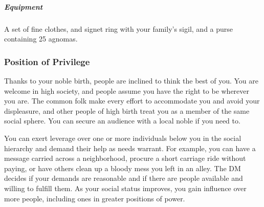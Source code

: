     \subparagraph{Equipment} A set of fine clothes, and signet ring with your family's sigil, and a purse containing 25 agnomas.

    \subsubsection{Position of Privilege}
        Thanks to your noble birth, people are inclined to think the best of you.
        You are welcome in high society, and people assume you have the right to be wherever you are.
        The common folk make every effort to accommodate you and avoid your displeasure, and other people of high birth treat you as a member of the same social sphere.
        You can secure an audience with a local noble if you need to.

        \thispagestyle{empty}

        \newpage

        You can exert leverage over one or more individuals below you in the social hierarchy and demand their help as needs warrant.
        For example, you can have a message carried across a neighborhood, procure a short carriage ride without paying, or have others clean up a bloody mess you left in an alley.
        The DM decides if your demands are reasonable and if there are people available and willing to fulfill them.
        As your social status improves, you gain influence over more people, including ones in greater positions of power.


